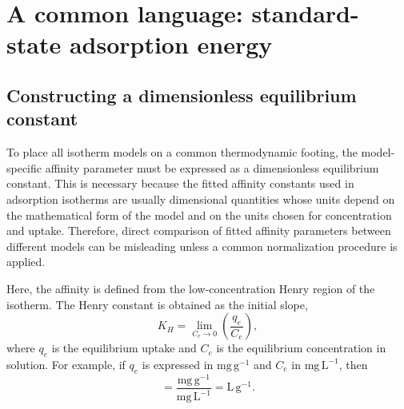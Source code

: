 \documentclass[journal=jacsat,manuscript=article]{achemso}
\begin{document}
	\section{A common language: standard-state adsorption energy}
	\label{sec:proposal}

\subsection{Constructing a dimensionless equilibrium constant}
\label{sec:dimensionless_K}

To place all isotherm models on a common thermodynamic footing, the model-specific affinity parameter must be expressed as a dimensionless equilibrium constant. This is necessary because the fitted affinity constants used in adsorption isotherms are usually dimensional quantities whose units depend on the mathematical form of the model and on the units chosen for concentration and uptake. Therefore, direct comparison of fitted affinity parameters between different models can be misleading unless a common normalization procedure is applied.

Here, the affinity is defined from the low-concentration Henry region of the isotherm. The Henry constant is obtained as the initial slope,
\begin{equation}
	K_H = \lim_{C_e \to 0} \left( \frac{q_e}{C_e} \right),
	\label{eq:Henry_constant}
\end{equation}
where $q_e$ is the equilibrium uptake and $C_e$ is the equilibrium concentration in solution. For example, if $q_e$ is expressed in $\mathrm{mg\,g^{-1}}$ and $C_e$ in $\mathrm{mg\,L^{-1}}$, then
\begin{equation}
	[K_H]
	=
	\frac{\mathrm{mg\,g^{-1}}}{\mathrm{mg\,L^{-1}}}
	=
	\mathrm{L\,g^{-1}}.
	\label{eq:KH_units}
\end{equation}
\end{document}
